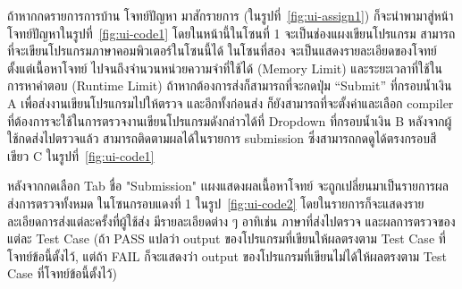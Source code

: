 \documentclass[12pt,oneside,openright,a4paper]{cpe-thai-project}
\begin{document}
    \begin{flushleft}
    ถ้าหากกดรายการการบ้าน โจทย์ปัญหา มาสักรายการ (ในรูปที่~\ref{fig:ui-assign1}) ก็จะนำพามาสู่หน้าโจทย์ปัญหาในรูปที่~\ref{fig:ui-code1} โดยในหน้านี้ในโซนที่ 1 จะเป็นช่องแผงเขียนโปรแกรม สามารถที่จะเขียนโปรแกรมภาษาคอมพิวเตอร์ในโซนนี้ได้ ในโซนที่สอง จะเป็นแสดงรายละเอียดของโจทย์ตั้งแต่เนื้อหาโจทย์ ไปจนถึงจำนวนหน่วยความจำที่ใช้ได้ (Memory Limit) และระยะเวลาที่ใช้ในการหาคำตอบ (Runtime Limit) ถ้าหากต้องการส่งก็สามารถที่จะกดปุ่ม “Submit” ที่กรอบน้ำเงิน A เพื่อส่งงานเขียนโปรแกรมไปให้ตรวจ และอีกทั้งก่อนส่ง ก็ยังสามารถที่จะตั้งค่าและเลือก compiler ที่ต้องการจะใช้ในการตรวจงานเขียนโปรแกรมดังกล่าวได้ที่ Dropdown ที่กรอบน้ำเงิน B หลังจากผู้ใช้กดส่งไปตรวจแล้ว สามารถติดตามผลได้ในรายการ submission ซึ่งสามารถกดดูได้ตรงกรอบสีเขียว C ในรูปที่~\ref{fig:ui-code1} 
    \end{flushleft}
    \begin{flushleft}
    หลังจากกดเลือก Tab ชื่อ "Submission" เเผงแสดงผลเนื้อหาโจทย์ จะถูกเปลี่ยนมาเป็นรายการผลส่งการตรวจทั้งหมด ในโซนกรอบแดงที่ 1 ในรูป~\ref{fig:ui-code2} โดยในรายการก็จะแสดงรายละเอียดการส่งแต่ละครั้งที่ผู้ใช้ส่ง มีรายละเอียดต่าง ๆ อาทิเช่น ภาษาที่ส่งไปตรวจ และผลการตรวจของแต่ละ Test Case (ถ้า PASS แปลว่า output ของโปรแกรมที่เขียนให้ผลตรงตาม Test Case ที่โจทย์ข้อนี้ตั้งไว้, แต่ถ้า FAIL ก็จะแสดงว่า output ของโปรแกรมที่เขียนไม่ได้ให้ผลตรงตาม Test Case ที่โจทย์ข้อนี้ตั้งไว้)
    \end{flushleft}
    
\end{document}

